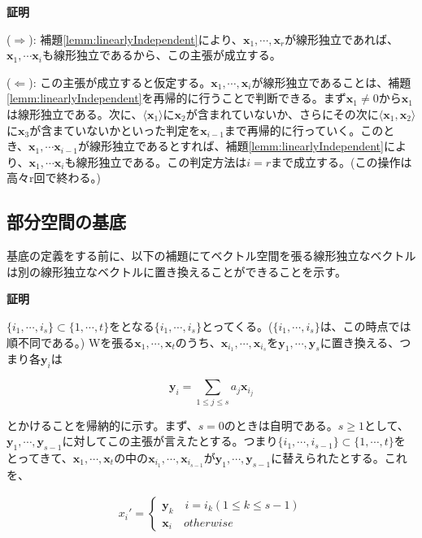 \documentclass[dvipdfmx,autodetect-engine]{jsarticle}
\begin{document}
{\bf 証明}

($\Rightarrow$): 補題\ref{lemm:linearlyIndependent}により、$\bm{x}_1, \cdots, \bm{x}_r$が線形独立であれば、$\bm{x}_1, \cdots \bm{x}_i$も線形独立であるから、この主張が成立する。

($\Leftarrow$): この主張が成立すると仮定する。$\bm{x}_1, \cdots, \bm{x}_i$が線形独立であることは、補題\ref{lemm:linearlyIndependent}を再帰的に行うことで判断できる。まず$\bm{x}_1 \neq 0$から$\bm{x}_1$は線形独立である。次に、$\langle \bm{x}_1 \rangle$に$\bm{x}_2$が含まれていないか、さらにその次に$\langle \bm{x}_1, \bm{x}_2 \rangle$に$\bm{x}_3$が含まていないかといった判定を$\bm{x}_{i-1}$まで再帰的に行っていく。このとき、$\bm{x}_1, \cdots \bm{x}_{i-1}$が線形独立であるとすれば、補題\ref{lemm:linearlyIndependent}により、$\bm{x}_1, \cdots \bm{x}_i$も線形独立である。この判定方法は$i = r$まで成立する。(この操作は高々r回で終わる。)

\subsection{部分空間の基底}

基底の定義をする前に、以下の補題にてベクトル空間を張る線形独立なベクトルは別の線形独立なベクトルに置き換えることができることを示す。

\label{lemm:basisReplacing}

{\bf 証明}

$\{i_1, \cdots, i_{s}\} \subset \{1, \cdots, t\}$をとなる$\{i_1, \cdots, i_{s}\}$とってくる。($\{i_1, \cdots, i_s\}$は、この時点では順不同である。) Wを張る$\bm{x}_1, \cdots, \bm{x}_t$のうち、$\bm{x}_{i_1}, \cdots, \bm{x}_{i_s}$を$\bm{y}_1, \cdots, \bm{y}_s$に置き換える、つまり各$\bm{y}_i$は

$$
\bm{y}_i = \sum_{1 \leq j \leq s} a_j\bm{x}_{i_j}
$$

とかけることを帰納的に示す。まず、$s = 0$のときは自明である。$s \geq 1$として、$\bm{y}_1, \cdots, \bm{y}_{s-1}$に対してこの主張が言えたとする。つまり$\{i_1, \cdots, i_{s-1}\} \subset \{1, \cdots, t\}$をとってきて、$\bm{x}_1, \cdots, \bm{x}_t$の中の$\bm{x}_{i_1}, \cdots, \bm{x}_{i_{s-1}}$が$\bm{y}_1, \cdots, \bm{y}_{s-1}$に替えられたとする。これを、

\begin{eqnarray*}
  x_i' = \left\{
    \begin{array}{l}
      \bm{y}_k \quad i = i_k (1 \leq k \leq s -1) \\
      \bm{x}_i \quad otherwise
    \end{array}
  \right.
\end{eqnarray*}
\end{document}
